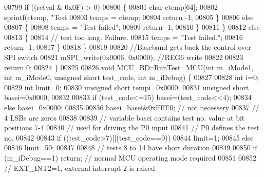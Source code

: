 \begin{DoxyCode}
{{{{{00799             \textcolor{keywordflow}{if} ((retval & 0x0F) > 0)
00800             \{
00801                 \textcolor{keywordtype}{char} ctemp[64];
00802                 sprintf(ctemp, \textcolor{stringliteral}{"Test %
00803                 temps = ctemp;
00804                 \textcolor{keywordflow}{return} -1;
00805             \}
00806             \textcolor{keywordflow}{else}
00807             \{
00808                 temps = \textcolor{stringliteral}{"Test failed"};
00809                 \textcolor{keywordflow}{return} -1;
00810             \}
00811         \}
00812         \textcolor{keywordflow}{else}
00813         \{
00814             \textcolor{comment}{// test too long. Failure.}
00815             temps = \textcolor{stringliteral}{"Test failed."};
00816             \textcolor{keywordflow}{return} -1;
00817         \}
00818     \}
00819 
00820     \textcolor{comment}{//Baseband gets back the control over SPI switch}
00821     mSPI\_write(0x0006, 0x0000); \textcolor{comment}{//REG6 write}
00822 
00823     \textcolor{keywordflow}{return} 0;
00824 \}
00825 
00826 \textcolor{keywordtype}{void} MCU\_BD::RunTest\_MCU(\textcolor{keywordtype}{int} m\_iMode1, \textcolor{keywordtype}{int} m\_iMode0, \textcolor{keywordtype}{unsigned} \textcolor{keywordtype}{short} test\_code, \textcolor{keywordtype}{int} m\_iDebug) \{
00827 
00828     \textcolor{keywordtype}{int} i=0;
00829     \textcolor{keywordtype}{int} limit=0;
00830     \textcolor{keywordtype}{unsigned} \textcolor{keywordtype}{short} tempi=0x0000;
00831     \textcolor{keywordtype}{unsigned} \textcolor{keywordtype}{short} basei=0x0000;
00832 
00833     \textcolor{keywordflow}{if}  (test\_code<=15) basei=(test\_code<<4);
00834     \textcolor{keywordflow}{else} basei=0x0000;
00835 
00836     basei=basei&0xFFF0; \textcolor{comment}{// not necessery}
00837     \textcolor{comment}{// 4 LSBs are zeros}
00838 
00839     \textcolor{comment}{// variable basei contains test no. value at bit positions 7-4}
00840     \textcolor{comment}{// used for driving the P0 input}
00841     \textcolor{comment}{// P0 defines the test no.}
00842 
00843     \textcolor{keywordflow}{if} ((test\_code>7)||(test\_code==0))
00844         limit=1;
00845     \textcolor{keywordflow}{else}
00846         limit=50;
00847 
00848     \textcolor{comment}{// tests 8 to 14 have short duration}
00849 
00850     \textcolor{keywordflow}{if} (m\_iDebug==1) \textcolor{keywordflow}{return}; \textcolor{comment}{// normal MCU operating mode required}
00851 
00852     \textcolor{comment}{// EXT\_INT2=1, external interrupt 2 is raised}
}}}}}}
\end{DoxyCode}
